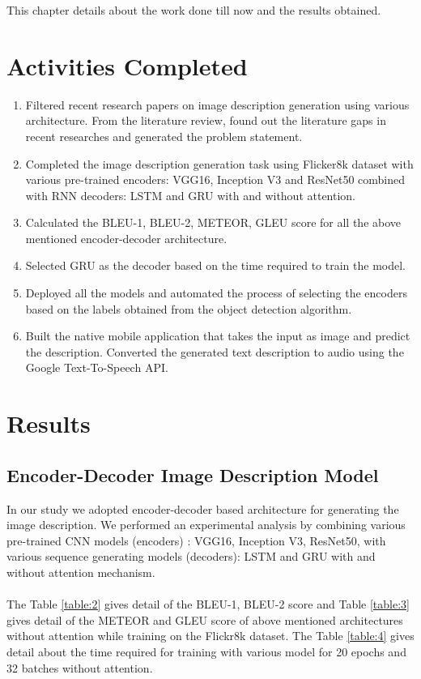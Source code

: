 \clearpage
\noindent This chapter details about the work done till now and the results obtained.
\section{Activities Completed}
\begin{enumerate}
    \item Filtered recent research papers on image description generation using various architecture. From the literature review, found out the literature gaps in recent researches and generated the problem statement.
    \item Completed the image description generation task using Flicker8k dataset with various pre-trained encoders: VGG16, Inception V3 and ResNet50 combined with RNN decoders: LSTM and GRU with and without attention.
    \item Calculated the BLEU-1, BLEU-2, METEOR, GLEU score for all the above mentioned encoder-decoder architecture.
    \item Selected GRU as the decoder based on the time required to train the model.
    \item Deployed all the models and automated the process of selecting the encoders based on the labels obtained from the object detection algorithm.
    \item Built the native mobile application that takes the input as image and predict the description. Converted the generated text description to audio using the Google Text-To-Speech
API.
\end{enumerate}

\section{Results}
\subsection{Encoder-Decoder Image Description Model}
\noindent In our study we adopted encoder-decoder based architecture for generating the image description. We performed an experimental analysis by combining various pre-trained CNN models (encoders) : VGG16, Inception V3, ResNet50, with various sequence generating models (decoders): LSTM and GRU with and without attention mechanism. \\ \\
\noindent The Table \ref{table:2} gives detail of the BLEU-1, BLEU-2 score and Table \ref{table:3} gives detail of the METEOR and GLEU score of above mentioned architectures without attention while training on the Flickr8k dataset. The Table \ref{table:4} gives detail about the time required for training with various model for 20 epochs and 32 batches without attention. \\

